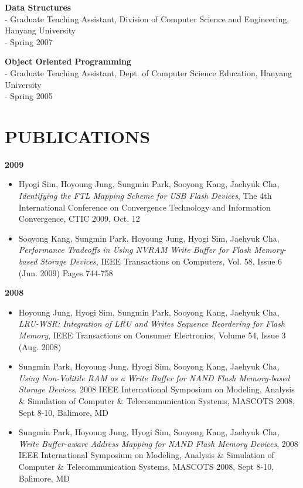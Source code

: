 \documentclass{res}
\begin{document}
\begin{resume}
   {\bf Data Structures}
      \vspace{0.02in}\\
      - {\small Graduate Teaching Assistant, Division of Computer Science and
      Engineering, Hanyang University}\\
      - {\small Spring 2007}

   {\bf Object Oriented Programming}
      \vspace{0.02in}\\
      - {\small Graduate Teaching Assistant, Dept. of Computer Science
      Education, Hanyang University}\\
      - {\small Spring 2005}

\section{PUBLICATIONS} 
\vspace{0.1in}

{\bf 2009}
 \begin{itemize}
  \item Hyogi Sim, Hoyoung Jung, Sungmin Park, Sooyong Kang, Jaehyuk Cha,
  {\it Identifying the FTL Mapping Scheme for USB Flash Devices},
  The 4th International Conference on Convergence Technology
  and Information Convergence, CTIC 2009, Oct. 12
  \item Sooyong Kang, Sungmin Park, Hoyoung Jung, Hyogi Sim, Jaehyuk Cha,
  {\it Performance Tradeoffs in Using NVRAM Write Buffer for Flash Memory-based
  Storage Devices},
  IEEE Transactions on Computers, Vol. 58, Issue 6 (Jun. 2009) Pages 744-758
 \end{itemize}

{\bf 2008}
 \begin{itemize}
 \item Hoyoung Jung, Hyogi Sim, Sungmin Park, Sooyong Kang, Jaehyuk Cha,
 {\it LRU-WSR: Integration of LRU and Writes Sequence Reordering for Flash
 Memory},
 IEEE Transactions on Consumer Electronics, Volume 54, Issue 3 (Aug. 2008)
 \end{itemize}
 \begin{itemize}
 \item Sungmin Park, Hoyoung Jung, Hyogi Sim, Sooyong Kang, Jaehyuk Cha,
 {\it Using Non-Volitile RAM as a Write Buffer for NAND Flash Memory-based
 Storage Devices},
 2008 IEEE International Symposium on Modeling, Analysis \& Simulation of
 Computer \& Telecommunication Systems, MASCOTS 2008, Sept 8-10, Balimore, MD
 \end{itemize}
 \begin{itemize}
 \item Sungmin Park, Hoyoung Jung, Hyogi Sim, Sooyong Kang, Jaehyuk Cha,
 {\it Write Buffer-aware Address Mapping for NAND Flash Memory Devices},
 2008 IEEE International Symposium on Modeling, Analysis \& Simulation of
 Computer \& Telecommunication Systems, MASCOTS 2008, Sept 8-10, Balimore, MD
 \end{itemize}


\end{resume}
\end{document}
